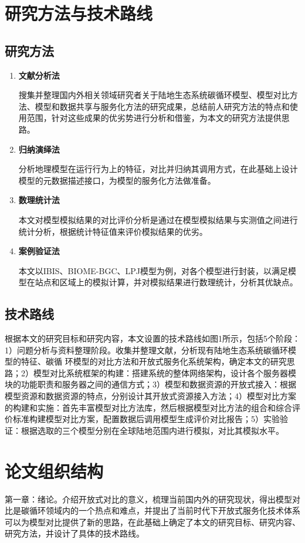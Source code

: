 \section{研究方法与技术路线}

\subsection{研究方法}
\begin{enumerate}[(1)]
\item \textbf{文献分析法}

搜集并整理国内外相关领域研究者关于陆地生态系统碳循环模型、模型对比方法、模型和数据共享与服务化方法的研究成果，总结前人研究方法的特点和使用范围，针对这些成果的优劣势进行分析和借鉴，为本文的研究方法提供思路。

\item \textbf{归纳演绎法}

分析地理模型在运行行为上的特征，对比并归纳其调用方式，在此基础上设计模型的元数据描述接口，为模型的服务化方法做准备。

\item \textbf{数理统计法}

本文对模型模拟结果的对比评价分析是通过在模型模拟结果与实测值之间进行统计分析，根据统计特征值来评价模拟结果的优劣。

\item \textbf{案例验证法}

本文以IBIS、BIOME-BGC、LPJ模型为例，对各个模型进行封装，以满足模型在站点和区域上的模拟计算，并对模拟结果进行数理统计，分析其优缺点。
\end{enumerate}


\subsection{技术路线}
根据本文的研究目标和研究内容，本文设置的技术路线如图1所示，包括5个阶段：1）问题分析与资料整理阶段。收集并整理文献，分析现有陆地生态系统碳循环模型的特征、碳循 环模型的对比方法和开放式服务化系统架构，确定本文的研究思路；2）模型对比系统框架的构建：搭建系统的整体网络架构，设计各个服务器模块的功能职责和服务器之间的通信方式；3）模型和数据资源的开放式接入：根据模型资源和数据资源的特点，分别设计其开放式资源接入方法；4）模型对比方案的构建和实施：首先丰富模型对比方法库，然后根据模型对比方法的组合和综合评价标准构建模型对比方案，配置数据后调用模型生成评价对比报告；5）实验验证：根据选取的三个模型分别在全球陆地范围内进行模拟，对比其模拟水平。

\section{论文组织结构}
第一章：绪论。介绍开放式对比的意义，梳理当前国内外的研究现状，得出模型对比是碳循环领域内的一个热点和难点，并提出了当前时代下开放式服务化技术体系可以为模型对比提供了新的思路，在此基础上确定了本文的研究目标、研究内容、研究方法，并设计了具体的技术路线。

